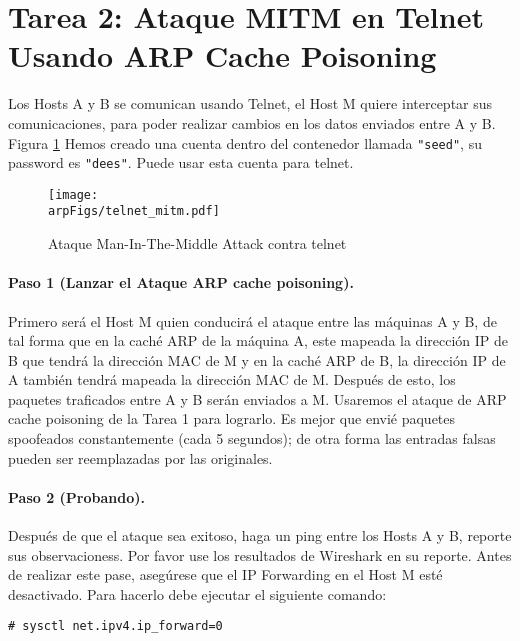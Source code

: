 \section{Tarea 2: Ataque MITM en Telnet Usando ARP Cache Poisoning}

Los Hosts A y B se comunican usando Telnet, el Host M quiere interceptar sus comunicaciones, para poder realizar cambios en los datos enviados entre A y B. Figura \ref{arp:fig:telnet_mitm}
Hemos creado una cuenta dentro del contenedor llamada \texttt{"seed"}, su password es \texttt{"dees"}. Puede usar esta cuenta para telnet.


\begin{figure}
    \centering
    \texttt{[image: \\arpFigs/telnet\_mitm.pdf]}
    \caption{Ataque Man-In-The-Middle Attack contra telnet}
    \label{arp:fig:telnet_mitm}
\end{figure}


\paragraph{Paso 1 (Lanzar el Ataque ARP cache poisoning).} Primero será el Host M quien conducirá el ataque entre las máquinas A y B, de tal forma que en la caché ARP de la máquina A, este mapeada la dirección IP de B que tendrá la dirección MAC de M y en la caché ARP de B, la dirección IP de A también tendrá mapeada la dirección MAC de M. Después de esto, los paquetes traficados entre A y B serán enviados a M. Usaremos el ataque de ARP cache poisoning de la Tarea 1 para lograrlo. Es mejor que envié paquetes spoofeados constantemente (cada 5 segundos); de otra forma las entradas falsas pueden ser reemplazadas por las originales.


\paragraph{Paso 2 (Probando).} Después de que el ataque sea exitoso, haga un ping entre los Hosts A y B, reporte sus observacioness. Por favor use los resultados de Wireshark en su reporte. Antes de realizar este pase, asegúrese que el IP Forwarding en el Host M esté desactivado. Para hacerlo debe ejecutar el siguiente comando:

\begin{lstlisting}
# sysctl net.ipv4.ip_forward=0
\end{lstlisting}

